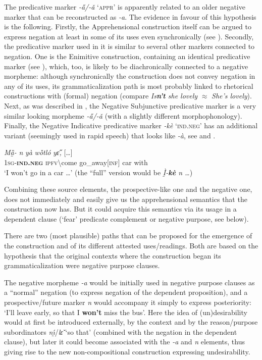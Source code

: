 \documentclass[output=paper,colorlinks,citecolor=brown]{langscibook}
\begin{document}
 The predicative marker \textit{-a̋/-ǎ} `\textsc{appr}' is apparently related to an older negative marker that can be reconstructed as \textit{\text{*}-a}. The evidence in favour of this hypothesis is the following. Firstly, the Apprehensional construction itself can be argued to express negation at least in some of its uses even synchronically (see ). Secondly, the predicative marker used in it is similar to several other  markers connected to negation. One is the Enimitive construction, containing an identical predicative marker (see ), which, too, is likely to be diachronically connected to a negative morpheme: although synchronically the construction does not convey negation in any of its uses, its grammaticalization path is most probably linked to rhetorical constructions with (formal) negation (compare  \textit{Is\textbf{n't} she lovely} $\approx$ \textit{She's lovely}). Next, as was described in , the Negative Subjunctive predicative marker is a very similar looking morpheme \textit{-a̋/-ǎ} (with a slightly different morphophonology). Finally, the Negative Indicative predicative marker \textit{-kè} `\textsc{ind.neg}' has an additional variant (seemingly used in rapid speech) that looks like \textit{-à}, see  and .


\ea \label{ex:Fed68}
\gll \textit{Mȁ̰-\textbf{{\à}}} \textit{n{\ù}} \textit{yà} \textit{wȍtló} \textit{yɛ̋,} \textup{[}\ldots\textup{]} \\
\textsc{1sg-\textbf{ind.neg}} \textsc{ipfv\backslash}come go\_away[\textsc{inf}] car with \\
\glt `I won't go in a car {\dots'} (the ``full'' version would be \textit{Ḭ̀-\textbf{kè} n{\ù} {\dots}})
\z


 Combining these source elements, the prospective-like one and the negative one, does not immediately and easily give us the apprehensional semantics that the construction now has. But it could acquire this semantics via its usage in a dependent clause (`fear' predicate complement or negative purpose, see below).

There are two (most plausible) paths that can be proposed for the emergence of the construction and of its different attested uses\slash readings. Both are based on the hypothesis that the original contexts where the construction began its grammaticalization were negative purpose clauses.

The negative morpheme \textit{\text{*}-a} would be initially used in negative purpose clauses as a ``normal'' negation (to express negation of the dependent proposition), and a prospective\slash future marker \textit{n{\ù}} would accompany it simply to express posteriority: `I'll leave early, so that I \textbf{won't} miss the bus'. Here the idea of (un)desirability would at first be introduced externally, by the context and by the reason\slash purpose subordinators \textit{nı̰́}\slash\textit{lɛ̌} `so that' (combined with the negation in the dependent clause), but later it could become associated with the \textit{\text{*}-a} and \textit{n{\ù}} elements, thus giving rise to the new non-compositional construction expressing undesirability.
\end{document}
